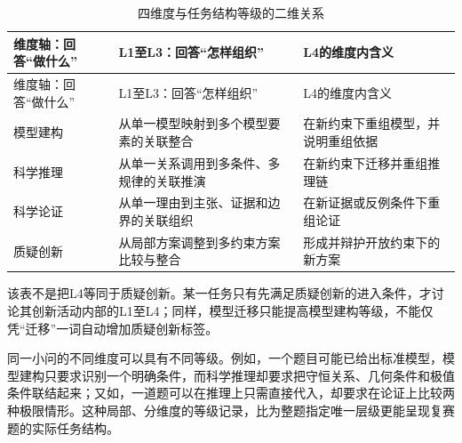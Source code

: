 \documentclass[
  12pt,
  a4paper,twoside,openany]{ctexbook}
\begin{document}
\begin{longtable}[]{@{}
  >{\raggedright\arraybackslash}p{}
  >{\raggedright\arraybackslash}p{}
  >{\raggedright\arraybackslash}p{}@{}}
\caption{四维度与任务结构等级的二维关系}\tabularnewline
\toprule\noalign{}
\rowcolor{ThesisPale}
\begin{minipage}[b]{\linewidth}\raggedright
维度轴：回答``做什么''
\end{minipage} & \begin{minipage}[b]{\linewidth}\raggedright
L1至L3：回答``怎样组织''
\end{minipage} & \begin{minipage}[b]{\linewidth}\raggedright
L4的维度内含义
\end{minipage} \\
\midrule\noalign{}
\endfirsthead
\toprule\noalign{}
\rowcolor{ThesisPale}
\begin{minipage}[b]{\linewidth}\raggedright
维度轴：回答``做什么''
\end{minipage} & \begin{minipage}[b]{\linewidth}\raggedright
L1至L3：回答``怎样组织''
\end{minipage} & \begin{minipage}[b]{\linewidth}\raggedright
L4的维度内含义
\end{minipage} \\
\midrule\noalign{}
\endhead
\bottomrule\noalign{}
\endlastfoot
模型建构 & 从单一模型映射到多个模型要素的关联整合 &
在新约束下重组模型，并说明重组依据 \\
科学推理 & 从单一关系调用到多条件、多规律的关联推演 &
在新约束下迁移并重组推理链 \\
科学论证 & 从单一理由到主张、证据和边界的关联组织 &
在新证据或反例条件下重组论证 \\
质疑创新 & 从局部方案调整到多约束方案比较与整合 &
形成并辩护开放约束下的新方案 \\
\end{longtable}

该表不是把L4等同于质疑创新。某一任务只有先满足质疑创新的进入条件，才讨论其创新活动内部的L1至L4；同样，模型迁移只能提高模型建构等级，不能仅凭``迁移''一词自动增加质疑创新标签。

同一小问的不同维度可以具有不同等级。例如，一个题目可能已给出标准模型，模型建构只要求识别一个明确条件，而科学推理却要求把守恒关系、几何条件和极值条件联结起来；又如，一道题可以在推理上只需直接代入，却要求在论证上比较两种极限情形。这种局部、分维度的等级记录，比为整题指定唯一层级更能呈现复赛题的实际任务结构。
\end{document}
